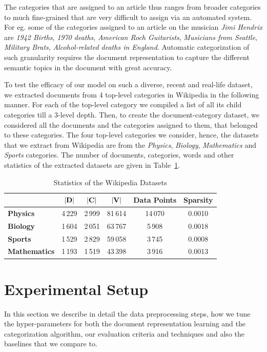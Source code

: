 The categories that are assigned to an article thus ranges from broader categories to much fine-grained that are very difficult to assign via an automated system. For eg. some of the categories assigned to an article on the musician \emph{Jimi Hendrix} are \emph{1942 Births}, \emph{1970 deaths}, \emph{American Roch Guitarists}, \emph{Musicians from Seattle}, \emph{Military Brats}, \emph{Alcohol-related deaths in England}. Automatic categorization of such granularity requires the document representation to capture the different semantic topics in the document with great accuracy.

To test the efficacy of our model on such a diverse, recent and real-life dataset, we extracted documents from 4 top-level categories in Wikipedia in the following manner. For each of the top-level category we compiled a list of all its child categories till a 3-level depth. Then, to create the document-category dataset, we considered all the documents and the categories assigned to them, that belonged to these categories. The four top-level categories we consider, hence, the datasets that we extract from Wikipedia are from the \emph{Physics}, \emph{Biology}, \emph{Mathematics} and \emph{Sports} categories. The number of documents, categories, words and other statistics of the extracted datasets are given in Table~\ref{wiki:data:stat}.

\begin{table}[h!]
\begin{center}
\begin{tabular}{l c c c c c} %
\toprule
& \textbf{$|\mathbf{D}|$} & \textbf{$|\mathbf{C}|$} & \textbf{$|\mathbf{V}|$} & \textbf{Data Points} & \textbf{Sparsity}\\
\midrule
\textbf{Physics}		& 4\,229 & 2\,999 & 81\,614 & 14\,070 & 0.0010 \\
\textbf{Biology}		& 1\,604 & 2\,051 & 63\,767 & 5\,908 & 0.0018 \\
\textbf{Sports}			& 1\,529 & 2\,829 & 59\,058 & 3\,745 & 0.0008 \\
\textbf{Mathematics}	& 1\,193 & 1\,519 & 43\,398 & 3\,916 & 0.0013 \\
\bottomrule         
\end{tabular}
\caption{\label{wiki:data:stat}Statistics of the Wikipedia Datasets}
\end{center}
\end{table}

\section{Experimental Setup}
\label{sec:exp_setup}
In this section we describe in detail the data preprocessing steps, how we tune the hyper-parameters for both the document representation learning and the categorization algorithm, our evaluation criteria and techniques and also the baselines that we compare to.

